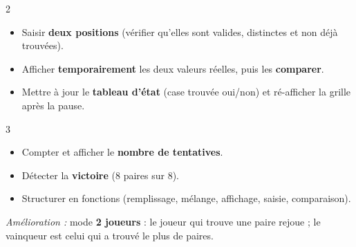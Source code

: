 \begin{UPSTICahierDesCharges}{2}
\begin{itemize}
  \item Saisir \textbf{deux positions} (vérifier qu'elles sont valides, distinctes et non déjà trouvées).
  \item Afficher \textbf{temporairement} les deux valeurs réelles, puis les \textbf{comparer}.
  \item Mettre à jour le \textbf{tableau d'état} (case trouvée oui/non) et ré-afficher la grille après la pause.
\end{itemize}
\end{UPSTICahierDesCharges}

\begin{UPSTICahierDesCharges}{3}
\begin{itemize}
  \item Compter et afficher le \textbf{nombre de tentatives}.
  \item Détecter la \textbf{victoire} (8 paires sur 8).
  \item Structurer en fonctions (remplissage, mélange, affichage, saisie, comparaison).
\end{itemize}
\end{UPSTICahierDesCharges}

\textit{Amélioration :} mode \textbf{2 joueurs} : le joueur qui trouve une paire rejoue ; le vainqueur est celui qui a trouvé le plus de paires.

